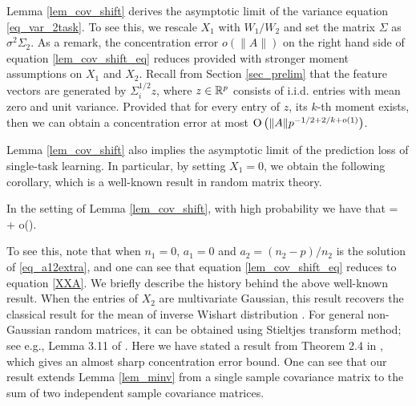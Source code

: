 Lemma \ref{lem_cov_shift} derives the asymptotic limit of the variance equation \eqref{eq_var_2task}.
To see this, we rescale $X_1$ with $W_1 / W_2$ and set the matrix $\Sigma$ as $\sigma^2 \Sigma_2$.
As a remark, the concentration error $o(\|A\|)$ on the right hand side of equation \eqref{lem_cov_shift_eq} reduces provided with stronger moment assumptions on $X_1$ and $X_2$. %
Recall from Section \ref{sec_prelim} that the feature vectors are generated by $\Sigma_i^{1/2} z$, where $z\in\mathbb{R}^p$ consists of i.i.d. entries with mean zero and unit variance.
Provided that for every entry of $z$, its $k$-th moment exists, then we can obtain a concentration error at most $\operatorname{O}\left(\|A\| p^{-1/2 + 2/k + o(1)}\right)$.

Lemma \ref{lem_cov_shift} also implies the asymptotic limit of the prediction loss of single-task learning.
In particular, by setting $X_1 = 0$, we obtain the following corollary, which is a well-known result in random matrix theory.
\begin{corollary}\label{lem_minv}
	In the setting of Lemma \ref{lem_cov_shift}, with high probability we have that
	\be\label{XXA}   =  \cdot {} + o(). \ee
\end{corollary} %
To see this, note that when $n_1=0$, $a_1 = 0$ and $a_2 = (n_2-p) / n_2$ is the solution of \eqref{eq_a12extra}, and one can see that equation \eqref{lem_cov_shift_eq} reduces to equation \eqref{XXA}.
We briefly describe the history behind the above well-known result.
When the entries of $X_2$ are multivariate Gaussian, this result recovers the classical result for the mean of inverse Wishart distribution \cite{anderson1958introduction}.
For general non-Gaussian random matrices, it can be obtained using Stieltjes transform method; see e.g., Lemma 3.11 of \cite{bai2009spectral}.
Here we have stated a result from Theorem 2.4 in \cite{isotropic}, which gives an almost sharp concentration error bound.
One can see that our result extends Lemma \ref{lem_minv} from a single sample covariance matrix to the sum of two independent sample covariance matrices.


